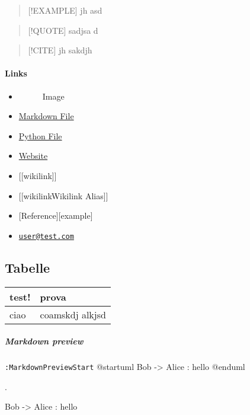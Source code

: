 \documentclass[
]{article}
\newenvironment{Shaded}{}{}
\newcommand{\NormalTok}[1]{#1}
\begin{document}
\begin{quote}
{[}!EXAMPLE{]} jh asd
\end{quote}

\begin{quote}
{[}!QUOTE{]} sadjsa d
\end{quote}

\begin{quote}
{[}!CITE{]} jh sakdjh
\end{quote}

\paragraph{Links}\label{links}


\begin{itemize}
\item
  \begin{figure}
  \centering
  \caption{Image}
  \end{figure}
\item
  \href{test.md}{Markdown File}
\item
  \href{test.py}{Python File}
\item
  \href{https://test.com}{Website}
\item
  {[}{[}wikilink{]}{]}
\item
  {[}{[}wikilink\textbar Wikilink Alias{]}{]}
\item
  {[}Reference{]}{[}example{]}
\item
  \href{mailto:user@test.com}{\nolinkurl{user@test.com}}
\end{itemize}

\subsection{Tabelle}\label{tabelle}

\begin{longtable}[]{@{}ll@{}}
\toprule\noalign{}
test! & prova \\
\midrule\noalign{}
\endhead
\bottomrule\noalign{}
\endlastfoot
ciao & coamskdj alkjsd \\
\end{longtable}

\subparagraph{Markdown preview}\label{markdown-preview}

\texttt{:MarkdownPreviewStart} @startuml Bob -\textgreater{} Alice :
hello @enduml

.

\begin{Shaded}
\begin{Highlighting}[]
\NormalTok{Bob {-}\textgreater{} Alice : hello}
\end{Highlighting}
\end{Shaded}
\end{document}

